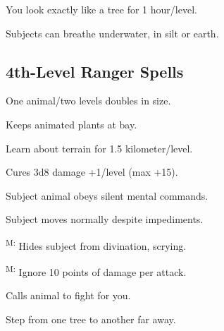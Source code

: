  You look exactly like a tree for 1 hour/level.

 Subjects can breathe underwater, in silt or earth. %



\subsection{4th-Level Ranger Spells}

 One animal/two levels doubles in size.

 Keeps animated plants at bay.

 Learn about terrain for 1.5 kilometer/level.

 Cures 3d8 damage +1/level (max +15).

 Subject animal obeys silent mental commands.

 Subject moves normally despite impediments.

\textsuperscript{M:} Hides subject from divination, scrying.

\textsuperscript{M:} Ignore 10 points of damage per attack.

 Calls animal to fight for you.

 Step from one tree to another far away.
